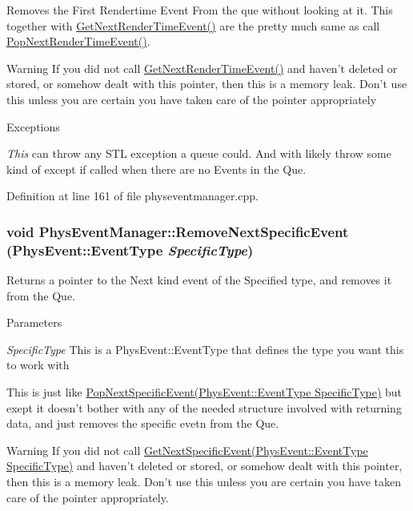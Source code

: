 Removes the First Rendertime Event From the que without looking at it. This together with \hyperlink{classPhysEventManager_a1f2d0506ce816176913e5bdfaa9fd724}{GetNextRenderTimeEvent()} are the pretty much same as call \hyperlink{classPhysEventManager_ad627925363fdbcff98e0faef204e81e2}{PopNextRenderTimeEvent()}. \begin{DoxyWarning}{Warning}
If you did not call \hyperlink{classPhysEventManager_a1f2d0506ce816176913e5bdfaa9fd724}{GetNextRenderTimeEvent()} and haven't deleted or stored, or somehow dealt with this pointer, then this is a memory leak. Don't use this unless you are certain you have taken care of the pointer appropriately 
\end{DoxyWarning}

\begin{DoxyExceptions}{Exceptions}
\item[{\em This}]can throw any STL exception a queue could. And with likely throw some kind of except if called when there are no Events in the Que. \end{DoxyExceptions}


Definition at line 161 of file physeventmanager.cpp.\hypertarget{classPhysEventManager_a2d0c21e369d16cd2de97eb4c69003323}{
\subsubsection[{RemoveNextSpecificEvent}]{\setlength{\rightskip}{0pt plus 5cm}void PhysEventManager::RemoveNextSpecificEvent (PhysEvent::EventType {\em SpecificType})}}
\label{d5/dd7/classPhysEventManager_a2d0c21e369d16cd2de97eb4c69003323}


Returns a pointer to the Next kind event of the Specified type, and removes it from the Que. 
\begin{DoxyParams}{Parameters}
\item[{\em SpecificType}]This is a PhysEvent::EventType that defines the type you want this to work with\end{DoxyParams}
This is just like \hyperlink{classPhysEventManager_abce156f7ad7ab145b8b05740b48e6073}{PopNextSpecificEvent(PhysEvent::EventType SpecificType)} but exept it doesn't bother with any of the needed structure involved with returning data, and just removes the specific evetn from the Que. \begin{DoxyWarning}{Warning}
If you did not call \hyperlink{classPhysEventManager_a56e45572c2fb84131f7d55c060c7ac21}{GetNextSpecificEvent(PhysEvent::EventType SpecificType)} and haven't deleted or stored, or somehow dealt with this pointer, then this is a memory leak. Don't use this unless you are certain you have taken care of the pointer appropriately. 
\end{DoxyWarning}

